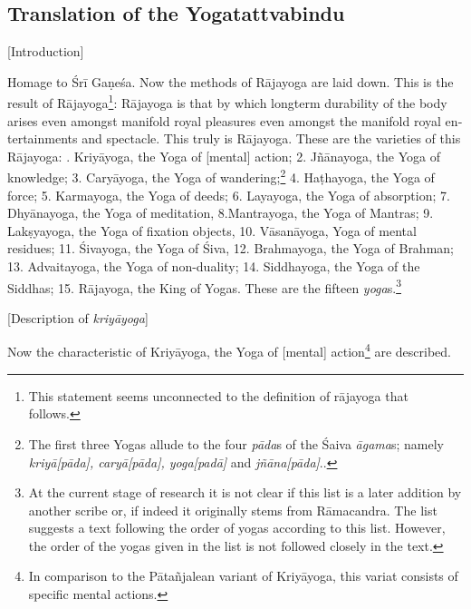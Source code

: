       

\begin{otherlanguage}{english}
\chapter{Translation of the Yogatattvabindu}    
\centerline{\textrm{\small{[Introduction]}}}
\bigskip
\begin{tlate}
Homage to Śrī Gaṇeśa. Now the methods of Rājayoga are laid down. This is the result of Rājayoga\footnote{This statement seems unconnected to the definition of rājayoga that follows.}: Rājayoga is that by which longterm durability of the body arises even amongst manifold royal pleasures even amongst the manifold royal entertainments and spectacle. This truly is Rājayoga. These are the varieties of this Rājayoga:
. Kriyāyoga, the Yoga of [mental] action; 2. Jñānayoga, the Yoga of knowledge; 3. Caryāyoga, the Yoga of wandering;\footnote{The first three Yogas allude to the four \textit{pāda}s of the Śaiva \textit{āgama}s; namely \textit{kriyā[pāda], caryā[pāda], yoga[padā]} and \textit{jñāna[pāda]}.\parencite[77]{nishvasa2015}.} 4. Haṭhayoga, the Yoga of force; 5. Karmayoga, the Yoga of deeds; 6. Layayoga, the Yoga of absorption; 7. Dhyānayoga, the Yoga of meditation, 8.Mantrayoga, the Yoga of Mantras; 9. Lakṣyayoga, the Yoga of fixation objects, 10. Vāsanāyoga, Yoga of mental residues; 11. Śivayoga, the Yoga of Śiva, 12. Brahmayoga, the Yoga of Brahman; 13. Advaitayoga, the Yoga of non-duality; 14. Siddhayoga, the Yoga of the Siddhas; 15. Rājayoga, the King of Yogas. These are the fifteen \textit{yoga}s.\footnote{At the current stage of research it is not clear if this list is a later addition by another scribe or, if indeed it originally stems from Rāmacandra. The list suggests a text following the order of yogas according to this list. However, the order of the yogas given in the list is not followed closely in the text.}
\end{tlate}
 \begin{tlate}
      \centerline{\textrm{\small{[Description of \textit{kriyāyoga}]}}}
      \bigskip
Now the characteristic of Kriyāyoga, the Yoga of [mental] action\footnote{In comparison to the Pātañjalean variant of Kriyāyoga, this variat consists of specific mental actions.} are described.

\end{tlate}
\end{otherlanguage}
